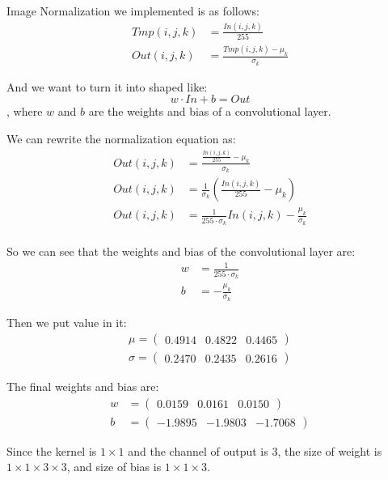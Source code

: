 \documentclass{article}
\begin{document}
Image Normalization we implemented is as follows:
\begin{align*}
    Tmp(i,j,k) &= \frac{In(i,j,k)}{255}\\
    Out(i,j,k) &= \frac{Tmp(i,j,k) - \mu_k}{\sigma_k}
\end{align*}

And we want to turn it into shaped like:
\[
w \cdot In + b = Out
\]
, where $w$ and $b$ are the weights and bias of a convolutional layer.

We can rewrite the normalization equation as:
\begin{align*}
    Out(i,j,k) &= \frac{\frac{In(i,j,k)}{255} - \mu_k}{\sigma_k}\\
    Out(i,j,k) &= \frac{1}{\sigma_k}\left(\frac{In(i,j,k)}{255} - \mu_k\right)\\
    Out(i,j,k) &= \frac{1}{255 \cdot \sigma_k}In(i,j,k) - \frac{\mu_k}{\sigma_k}\\
\end{align*}

So we can see that the weights and bias of the convolutional layer are:
\begin{align*}
    w &= \frac{1}{255 \cdot \sigma_k}\\
    b &= -\frac{\mu_k}{\sigma_k}
\end{align*}

Then we put value in it:
\begin{align*}
    \mu = \begin{pmatrix}
        0.4914 & 0.4822 & 0.4465
    \end{pmatrix}\\
    \sigma = \begin{pmatrix}
        0.2470 & 0.2435 & 0.2616
    \end{pmatrix}
\end{align*}

The final weights and bias are:
\begin{align*}
    w &= \begin{pmatrix}
        0.0159 & 0.0161 & 0.0150
    \end{pmatrix}\\
    b &= \begin{pmatrix}
        -1.9895 & -1.9803 & -1.7068
    \end{pmatrix}
\end{align*}

Since the kernel is $1 \times 1$ and the channel of output is 3, the size of weight is $1 \times 1 \times 3 \times 3$, and size of bias is $1 \times 1 \times 3$.
\end{document}

